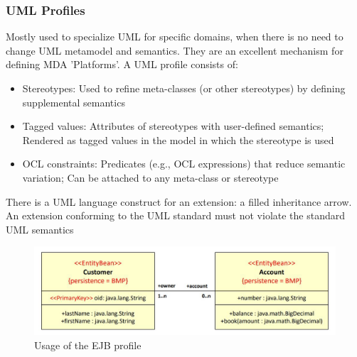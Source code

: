 			\subsubsection{UML Profiles}
				Mostly used to specialize UML for specific domains, when there is no need to change UML metamodel and semantics. They are an excellent mechanism for defining MDA 'Platforms'. A UML profile consists of:
				\begin{itemize}
					\item Stereotypes: Used to refine meta-classes (or other stereotypes) by defining supplemental semantics
					\item Tagged values: Attributes of stereotypes with user-defined semantics; Rendered as tagged values in the model in which the	stereotype is used 	
					\item OCL constraints: Predicates (e.g., OCL expressions) that reduce semantic variation; Can be attached to any meta-class or stereotype
				\end{itemize}
				There is a UML language construct for an extension: a filled inheritance arrow.\\
				An extension conforming to the UML standard must not violate the standard UML semantics
				\begin{figure}[h!]
					\includegraphics[scale=0.5]{res/uml-profile-ejb.jpg}
					\caption{Usage of the EJB profile}
				\end{figure}

			
			
				
				

		
		
		
		
		
		
		
		
		
		
		
		
		
		
		
		
		
		
			